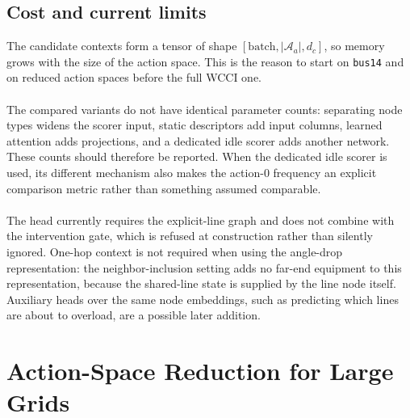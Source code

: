 {\color{blue}
\subsection{Cost and current limits}
\label{subsec:candidate-configuration}

The candidate contexts form a tensor of shape
$\left[\text{batch},|\mathcal{A}_a|,d_c\right]$, so memory grows with the size
of the action space. This is the reason to start on \texttt{bus14} and on
reduced action spaces before the full WCCI one.
\\
\\
The compared variants do not have identical parameter counts: separating node
types widens the scorer input, static descriptors add input columns, learned
attention adds projections, and a dedicated idle scorer adds another network.
These counts should therefore be reported. When the dedicated idle scorer is
used, its different mechanism also makes the action-$0$ frequency an explicit
comparison metric rather than something assumed comparable.
\\
\\
The head currently requires the explicit-line graph and does not combine with
the intervention gate, which is refused at construction rather than silently
ignored. One-hop context is not required when using the angle-drop
representation: the neighbor-inclusion setting
adds no far-end equipment to this representation, because the shared-line state
is supplied by the line node itself. Auxiliary heads over the same node
embeddings, such as predicting which lines are about to overload, are a possible
later addition.
}
\section{Action-Space Reduction for Large Grids}
\label{sec:wcci-action-space-reduction}

